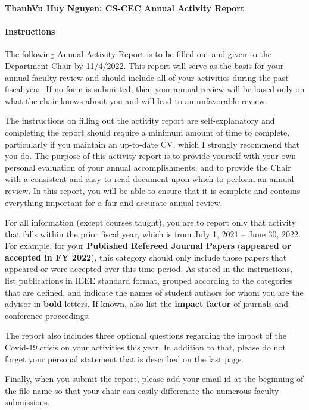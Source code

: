 \documentclass[11pt]{article}
\newcommand{\due}{11/4/2022}
\newcommand{\fy}{2022}
\newcommand{\fyperiod}{July 1, 2021 -- June 30, 2022}
\newcommand{\myname}{ThanhVu Huy Nguyen}
\begin{document}
\thispagestyle{empty}

\begin{center}
  \textbf{\Large {\myname}: CS-CEC Annual Activity Report}
\end{center}

\paragraph{Instructions} The following Annual Activity Report is to be filled out and given to
the Department Chair by \due{}. This report will serve as the
basis for your annual faculty review and should include all of your
activities during the past fiscal year. If no form is submitted, then
your annual review will be based only on what the chair knows about you
and will lead to an unfavorable review.

The instructions on filling out the activity report are self-explanatory
and completing the report should require a minimum amount of time to
complete, particularly if you maintain an up-to-date CV, which I
strongly recommend that you do. The purpose of this activity report is
to provide yourself with your own personal evaluation of your annual
accomplishments, and to provide the Chair with a consistent and easy to
read document upon which to perform an annual review. In this report,
you will be able to ensure that it is complete and contains everything
important for a fair and accurate annual review.

For all information (except courses taught), you are to report only that
activity that falls within the prior fiscal year, which is from \fyperiod{}. For example, for your \textbf{Published Refereed
Journal Papers} (\textbf{appeared or accepted in FY \fy{}}), this
category should only include those papers that appeared or were accepted
over this time period. As stated in the instructions, list publications
in IEEE standard format, grouped according to the categories that are
defined, and indicate the names of student authors for whom you are the
advisor in \textbf{bold} letters. If known, also list the \textbf{impact
factor} of journals and conference proceedings.

The report also includes three optional questions regarding the impact
of the Covid-19 crisis on your activities this year. In addition to
that, please do not forget your personal statement that is described on
the last page.

Finally, when you submit the report, please add your email id at the
beginning of the file name so that your chair can easily differenate the
numerous faculty submissions.
\end{document}
